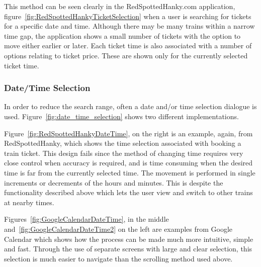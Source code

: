 This method can be seen clearly in the RedSpottedHanky.com application,
figure~\ref{fig:RedSpottedHankyTicketSelection} when a user is searching for
tickets for a specific date and time. Although there may be many trains within
a narrow time gap, the application shows a small number of tickets with the
option to move either earlier or later. Each ticket time is also associated
with a number of options relating to ticket price. These are shown only for the
currently selected ticket time.


\subsubsection{Date/Time Selection}
\label{ssub:date_time_selection}

In order to reduce the search range, often a date and/or time selection
dialogue is used. Figure~\ref{fig:date_time_selection} shows two different
implementations.

Figure~\ref{fig:RedSpottedHankyDateTime}, on the right is an example, again,
from RedSpottedHanky\cite{RedSpottedHanky}, which shows the time selection
associated with booking a train ticket. This design fails since the method of
changing time requires very close control when accuracy is required, and is
time consuming when the desired time is far from the currently selected time.
The movement is performed in single increments or decrements of the hours and
minutes. This is despite the functionality described above which lets the user
view and switch to other trains at nearby times.

Figures~\ref{fig:GoogleCalendarDateTime}, in the middle
and~\ref{fig:GoogleCalendarDateTime2} on the left are examples from Google
Calendar which shows how the process can be made much more intuitive, simple
and fast. Through the use of separate screens with large and clear selection,
this selection is much easier to navigate than the scrolling method used above.

